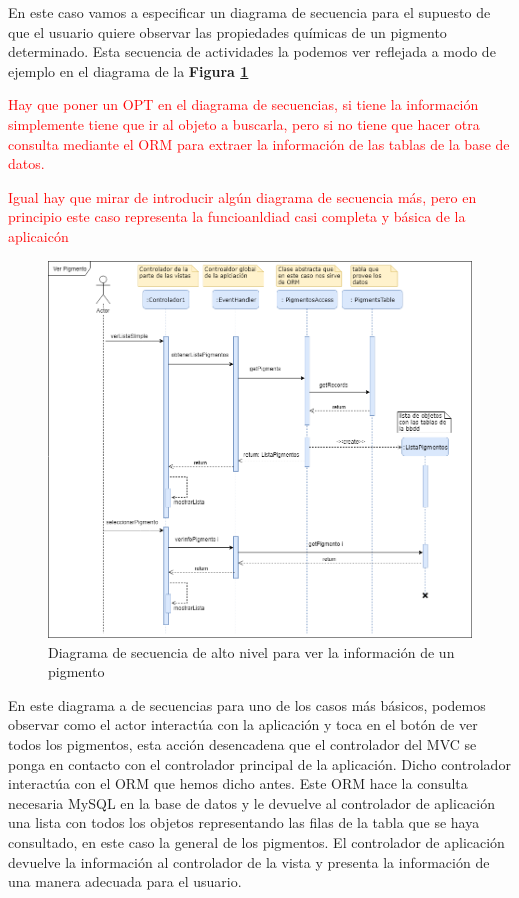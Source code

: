 En este caso vamos a especificar un diagrama de secuencia para el supuesto de que el usuario quiere observar las propiedades químicas de un pigmento determinado. Esta secuencia de actividades la podemos ver reflejada a modo de ejemplo en el diagrama de la \textbf{Figura \ref{fig:diagramaSecuenciaVerPigmento}} 

\textcolor{red}{Hay que poner un OPT en el diagrama de secuencias, si tiene la información simplemente tiene que ir al objeto a buscarla, pero si no tiene que hacer otra consulta mediante el ORM para extraer la información de las tablas de la base de datos.}

\textcolor{red}{Igual hay que mirar de introducir algún diagrama de secuencia más, pero en principio este caso representa la funcioanldiad casi completa y básica de la aplicaicón}

\begin{figure}[H]
    \centering
    \includegraphics[scale=0.5]{imagenes/diseno/verInfoPigmentoSecuencia.png}
    \caption{Diagrama de secuencia de alto nivel para ver la información de un pigmento}
    \label{fig:diagramaSecuenciaVerPigmento}
\end{figure}

En este diagrama a de secuencias para uno de los casos más básicos, podemos observar como el actor interactúa con la aplicación y toca en el botón de ver todos los pigmentos, esta acción desencadena que el controlador del MVC se ponga en contacto con el controlador principal de la aplicación. Dicho controlador interactúa con el ORM que hemos dicho antes. Este ORM hace la consulta necesaria MySQL en la base de datos y le devuelve al controlador de aplicación una lista con todos los objetos representando las filas de la tabla que se haya consultado, en este caso la general de los pigmentos. El controlador de aplicación devuelve la información al controlador de la vista y presenta la información de una manera adecuada para el usuario. 

